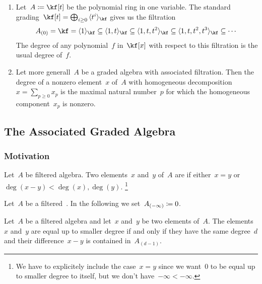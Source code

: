\begin{example}
	\leavevmode
	\begin{enumerate}
		\item
			Let~$A \defined \kf[t]$ be the polynomial ring in one variable.
			The standard grading~$\kf[t] = \bigoplus_{i \geq 0} {} \gen{ t^i }_{\kf}$ gives us the filtration
			\[
				A_{(0)}
				=
				\kf
				=
				\gen{ 1 }_{\kf}
				\subseteq
				\gen{ 1, t }_{\kf}
				\subseteq
				\gen{ 1, t, t^2 }_{\kf}
				\subseteq
				\gen{ 1, t, t^2, t^3 }_{\kf}
				\subseteq
				\dotsb
			\]
			The degree of any polynomial~$f$ in~$\kf[x]$ with respect to this filtration is the usual degree of~$f$.
		\item
			Let more generall~$A$ be a graded algebra with associated filtration.
			Then the degree of a nonzero element~$x$ of~$A$ with homogeneous decomposition~$x = \sum_{p \geq 0} x_p$ is the maximal natural number~$p$ for which the homogeneous component~$x_p$ is nonzero.
	\end{enumerate}
\end{example}



\subsection{The Associated Graded Algebra}

\subsubsection{Motivation}

\begin{definition}
	Let~$A$ be filtered algebra.
	Two elements~$x$ and~$y$ of~$A$ are  if either~$x = y$ or~$\deg(x-y) < \deg(x), \deg(y)$.%
	\footnote{
		We have to explicitely include the case~$x = y$ since we want~$0$ to be equal up to smaller degree to itself, but we don’t have~$-\infty < -\infty$.
	}
\end{definition}


\begin{convention}
	Let~$A$ be a filtered~\algebra{$\kf$}.
	In the following we set~$A_{(-\infty)} \coloneqq 0$.
\end{convention}


\begin{proposition}
	Let~$A$ be a filtered algebra and let~$x$ and~$y$ be two elements of~$A$.
	The elements~$x$ and~$y$ are equal up to smaller degree if and only if they have the same degree~$d$ and their difference~$x - y$ is contained in~$A_{(d-1)}$.%
\end{proposition}


